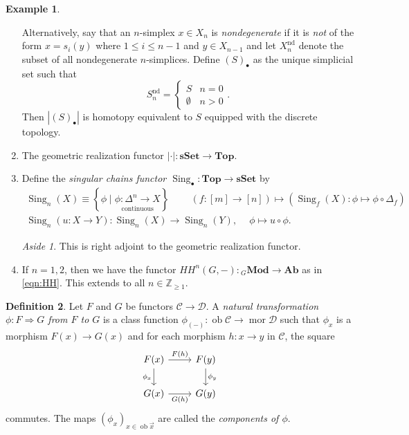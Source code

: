 \documentclass[10pt,letterpaper,cm]{nupset}
\theoremstyle{definition}
\newtheorem{definition}{Definition}[subsection]
\newtheorem{exmp}[definition]{Example}
\theoremstyle{theorem}
\theoremstyle{remark}
\newtheorem*{aside}{Aside}
\newcommand{\Z}{\mathbb Z}
\newcommand{\1}{\mathbf{1}}
\renewcommand{\c}{\mathscr{C}}
\renewcommand{\d}{\mathscr{D}}
\newcommand{\x}{\vec x}
\newcommand{\0}{\vec 0}
\DeclareMathOperator{\nd}{nd}
\DeclareMathOperator{\mor}{mor}
\DeclareMathOperator{\ob}{ob}
\DeclareMathOperator{\Sing}{Sing}
\begin{document}
\begin{exmp}
\begin{enumerate}
Alternatively, say that an $n$-simplex  $x\in X_n$ is \textit{nondegenerate} if it is \emph{not} of the form $x =s_i(y)$ where $1\leq i \leq n-1$ and $y\in X_{n-1}$ and let $X_n^{\nd}$ denote the subset of all nondegenerate $n$-simplices.  Define $\left(S\right)_{\bullet}$ as the unique simplicial set such that $$S_n^{\nd} = \begin{cases}
S & n =0 \\ \emptyset & n > 0 \end{cases}.$$ Then
 $\left\lvert{(S)_{\bullet}}\right\rvert$ is homotopy equivalent to $S$ equipped with the discrete topology. 
\item The geometric realization functor $\left\lvert{\cdot}\right\rvert : \mathbf{sSet} \to \mathbf{Top}$.
\item Define the \textit{singular chains functor $\Sing_{\bullet} : \mathbf{Top} \to \mathbf{sSet}$} by
\begin{gather*}
 \Sing_n(X) \equiv \left\{\phi \mid \underset{\text{continuous}}{\phi  : \Delta^n \to X}\right\} \quad \ \quad \left(f: [m] \to [n]\right) \mapsto \left(\Sing_f(X) : \phi \mapsto \phi \circ \Delta_f\right)
 \\ \Sing_n(u : X \to Y) : \Sing_n(X) \to \Sing_n(Y),\ \quad \phi \mapsto u \circ \phi.
 \end{gather*}
\begin{aside} This is right adjoint to the geometric realization functor. \end{aside}
\item If $n=1,2$, then we have the functor ${HH}^n(G, -) : {}_{G}\mathbf{Mod} \to \mathbf{Ab}$ as in \eqref{eqn:HH}. This extends to all $n\in \Z_{\geq 1}$.
\end{enumerate}
\end{exmp}

\smallskip

\begin{definition}
Let $F$ and $G$ be functors $\c \to \d$. A \textit{natural transformation $\phi: F\Rightarrow G$ from $F$ to $G$} is a class function $\phi_{(-)}: \ob{\c} \to \mor{\d}$ such that $\phi_x$ is a morphism $F(x) \to G(x)$ and for each morphism $h: x\to y$ in $\c$, the square
\[
\begin{tikzcd}
F(x) \arrow[d, "\phi_x"'] \arrow[r, "F(h)"] & F(y) \arrow[d, "\phi_y"] \\
G(x) \arrow[r, "G(h)"']                  & G(y)                 
\end{tikzcd}
\] commutes. The maps $\left(\phi_x\right)_{x\in \ob{\x}}$ are called the \textit{components of $\phi$}.
\end{definition}
\end{document}

